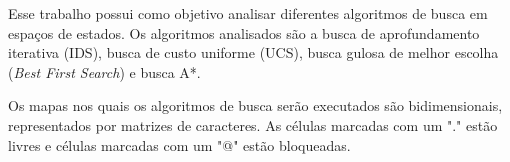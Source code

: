 Esse trabalho possui como objetivo analisar diferentes algoritmos de busca em espaços de estados. Os algoritmos analisados são a busca de aprofundamento iterativa (IDS), busca de custo uniforme (UCS), busca gulosa de melhor escolha (\textit{Best First Search}) e busca A*.

Os mapas nos quais os algoritmos de busca serão executados são bidimensionais, representados por matrizes de caracteres. As células marcadas com um "." estão livres e células marcadas com um "@" estão bloqueadas.